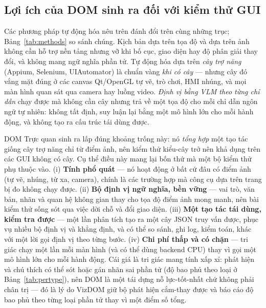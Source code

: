 \documentclass[11pt,a4paper]{article}
\begin{document}
\subsection{Lợi ích của DOM sinh ra đối với kiểm thử GUI}
\label{sec:dombenefits}
Các phương pháp tự động hóa nêu trên đánh đổi trên cùng những trục;
Bảng~\ref{tab:methods} so sánh chúng. Kịch bản dựa trên tọa độ và dựa trên ảnh không
cần hỗ trợ nền tảng nhưng vỡ khi bố cục, giao diện hay độ phân giải thay đổi, và không
mang ngữ nghĩa phần tử. Tự động hóa dựa trên \emph{cây trợ năng} (Appium, Selenium,
UIAutomator) là chuẩn vàng \emph{khi có cây} --- nhưng cây đó vắng mặt đúng ở các
canvas Qt/OpenGL tự vẽ, trò chơi, HMI nhúng, và mọi màn hình quan sát qua camera hay
luồng video. \emph{Định vị bằng VLM theo từng chỉ dẫn} chạy được mà không cần cây
nhưng trả về một tọa độ cho mỗi chỉ dẫn ngôn ngữ tự nhiên: không tất định, suy luận
lại bằng một mô hình lớn cho mỗi hành động, và không tạo ra cấu trúc tái dùng được.

DOM Trực quan sinh ra lấp đúng khoảng trống này: nó \emph{tổng hợp} một tạo tác giống
cây trợ năng chỉ từ điểm ảnh, nên kiểm thử kiểu-cây trở nên khả dụng trên các GUI
không có cây. Cụ thể điều này mang lại bốn thứ mà một bộ kiểm thử phụ thuộc vào.
(i) \textbf{Tính phổ quát} --- nó hoạt động ở bất cứ đâu có điểm ảnh (tự vẽ, nhúng, từ
xa, camera), chính là các trường hợp mà công cụ dựa trên trang bị đo không chạy được.
(ii) \textbf{Bộ định vị ngữ nghĩa, bền vững} --- vai trò, văn bản, nhãn và quan hệ
không gian thay cho tọa độ điểm ảnh mong manh, nên bài kiểm thử sống sót qua việc dời
chỗ và đổi giao diện. (iii) \textbf{Một tạo tác tái dùng, kiểm tra được} --- một lần
phân tích tạo ra một cây JSON truy vấn được, phục vụ nhiều bộ định vị và khẳng định,
và có thể so sánh, ghi log, kiểm toán, khác với một lời gọi định vị theo từng bước.
(iv) \textbf{Chi phí thấp và có chặn} --- tri giác chạy một lần mỗi màn hình (và có thể
dùng backend CPU) thay vì gọi một mô hình lớn cho mỗi hành động. Cái giá là tri giác
mang tính xấp xỉ: phát hiện và chú thích có thể sót hoặc gán nhãn sai phần tử (độ bao
phủ theo loại ở Bảng~\ref{tab:pertype}), nên DOM là một tái dựng nỗ lực-tốt-nhất chứ
không phải chân trị --- đó là lý do VizDOM giữ bộ phát hiện cắm-thay được và báo cáo độ
bao phủ theo từng loại phần tử thay vì một điểm số tổng.
\end{document}
